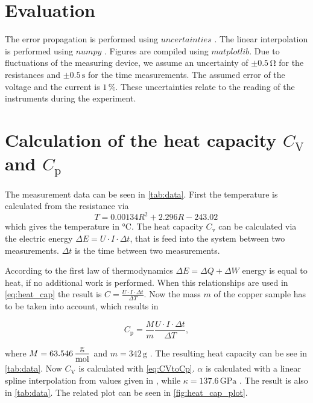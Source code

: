 \section{Evaluation}
\label{sec:Auswertung}



The error propagation is performed using $uncertainties$ \cite{unp}. The linear interpolation is performed using $numpy$ \cite{numpy}.
Figures are compiled using $matplotlib$\cite{Hunter:2007}. Due to fluctuations of the measuring device, we assume an uncertainty of
$\pm 0.5 \, \unit{\ohm}$ for the resistances and $\pm 0.5 \, \unit{\second} $ for the time measurements. 
The assumed error of the voltage and the current is $1 \, \%$. 
These uncertainties relate to the reading of the instruments during the experiment.

\section{Calculation of the heat capacity $C_\text{V}$ and $C_\text{p}$}
\label{sec:CVaCp}

The measurement data can be seen in \autoref{tab:data}. First the temperature is calculated from the resistance via 
\begin{equation*}
    \label{eq:RtoT}
    T = 0.00134 R^2 + 2.296 R - 243.02 \,
\end{equation*}
which gives the temperature in $\unit{\celsius}$.
The heat capacity $C_\text{v}$ can be calculated via the electric energy $\Delta E = U \cdot I \cdot \Delta t $, that is feed into the system between two measurements.
$\Delta t $ is the time between two measurements.

According to the first law of thermodynamics $ \Delta E = \Delta Q + \Delta W $ energy is equal to heat, if no additional work is performed.
When this relationships are used in \eqref{eq:heat_cap} the result is $C = \frac{U \cdot I \cdot \Delta t}{\Delta T}$. Now the mass $m$ of the copper sample has to be taken into account,
which results in 

\begin{equation*}
    C_\text{p} = \dfrac{M}{m} \frac{U \cdot I \cdot \Delta t}{\Delta T},
\end{equation*}

where $M = 63.546\, \unit{\dfrac{\gram}{\mol}}$\cite{Jefflab} and $m = 342 \,\unit{\gram}$ \cite{v47}.
The resulting heat capacity can be see in \autoref{tab:data}.
Now $C_\text{V} $ is calculated with \eqref{eq:CVtoCp}. $\alpha $ is calculated with a linear spline interpolation from values given in \cite{v47}, while $\kappa = 137.6 \, \unit{\giga\pascal} $ \cite{KO202193}.
The result is also in \autoref{tab:data}.
The related plot can be seen in \autoref{fig:heat_cap_plot}.

